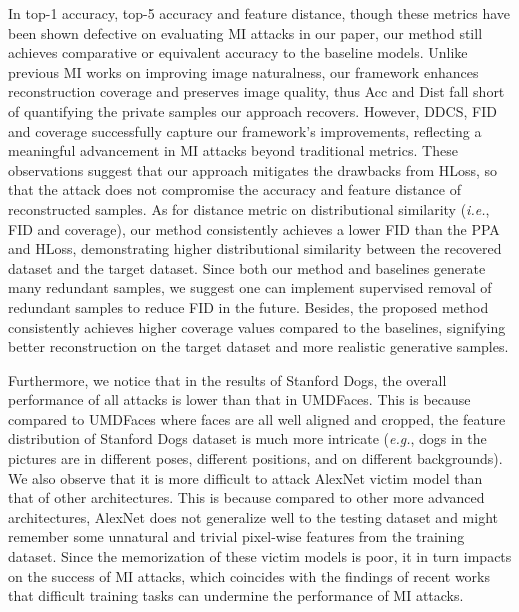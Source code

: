 In top-1 accuracy, top-5 accuracy and feature distance, though these metrics have been shown defective on evaluating MI attacks in our paper, our method still achieves comparative or equivalent accuracy to the baseline models.
Unlike previous MI works on improving image naturalness, our framework enhances reconstruction coverage and preserves image quality, thus Acc and Dist fall short of quantifying the private samples our approach recovers. However, DDCS, FID and coverage successfully capture our framework's improvements, reflecting a meaningful advancement in MI attacks beyond traditional metrics.
These observations suggest that our approach mitigates the drawbacks from HLoss, so that the attack does not compromise the accuracy and feature distance of reconstructed samples.
As for distance metric on distributional similarity (\emph{i.e.}, FID and coverage), our method consistently achieves a lower FID than the PPA and HLoss, demonstrating higher distributional similarity between the recovered dataset and the target dataset.
Since both our method and baselines generate many redundant samples, we suggest one can implement supervised removal of redundant samples to reduce FID in the future.
Besides, the proposed method consistently achieves higher coverage values compared to the baselines, signifying better reconstruction on the target dataset and more realistic generative samples.


Furthermore, we notice that in the results of Stanford Dogs, the overall performance of all attacks is lower than that in UMDFaces.
This is because compared to UMDFaces where faces are all well aligned and cropped, the feature distribution of Stanford Dogs dataset is much more intricate (\emph{e.g.}, dogs in the pictures are in different poses, different positions, and on different backgrounds).
We also observe that it is more difficult to attack AlexNet victim model than that of other architectures.
This is because compared to other more advanced architectures, AlexNet does not generalize well to the testing dataset and might remember some unnatural and trivial pixel-wise features from the training dataset.
Since the memorization of these victim models is poor, it in turn impacts on the success of MI attacks, which coincides with the findings of recent works~\cite{mldoctor22usenix,gmi20cvpr} that difficult training tasks can undermine the performance of MI attacks.

